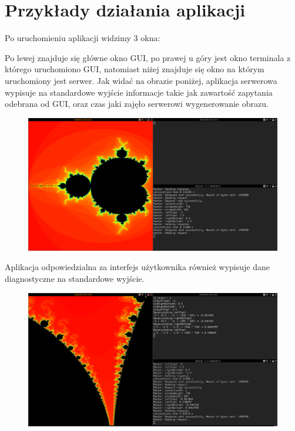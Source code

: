 \section{Przykłady działania aplikacji}
Po uruchomieniu aplikacji widzimy 3 okna:

Po lewej znajduje się główne okno GUI, po prawej u góry jest okno terminala z którego uruchomiono GUI, natomiast niżej znajduje się okno na którym uruchomiony jest serwer.
Jak widać na obrazie poniżej, aplikacja serwerowa wypisuje na standardowe wyjście informacje takie jak zawartość zapytania odebrana od GUI, oraz czas jaki zajęło serwerowi wygenerowanie obrazu.
\begin{figure}[H]
    \centering
    \includegraphics[width = \textwidth]{img/ex1.png}
\end{figure}

Aplikacja odpowiedzialna za interfejs użytkownika również wypisuje dane diagnostyczne na standardowe wyjście.
\begin{figure}[H]
    \centering
    \includegraphics[width = \textwidth]{img/ex2.png}
\end{figure}

